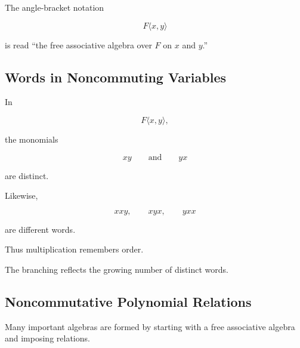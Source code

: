 The angle-bracket notation

\[ F\langle x,y\rangle \]

is read ``the free associative algebra over \(F\) on \(x\) and \(y\).''

\subsection{Words in Noncommuting Variables}
\label{subsec:noncommuting-words}

In

\[ F\langle x,y\rangle, \]

the monomials

\[ xy\qquad\text{and}\qquad yx \]

are distinct.

Likewise,

\[ xxy,\qquad xyx,\qquad yxx \]

are different words.

Thus multiplication remembers order.

\begin{center}
\end{center}

The branching reflects the growing number of distinct words.

\subsection{Noncommutative Polynomial Relations}
\label{subsec:noncommutative-relations}

Many important algebras are formed by starting with a free associative
algebra and imposing relations.

